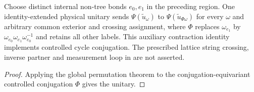 \begin{lemma}%
    \label{thm:peps_regular_two_cycle_global_conjugation}
    \leanok
    Choose distinct internal non-tree bonds $e_0,e_1$ in the preceding region.
    One identity-extended physical unitary sends
    $\Psi(\widetilde u_\omega)$ to $\Psi(\widetilde u_{\Phi\omega})$ for every
    $\omega$ and arbitrary common exterior and crossing assignment, where
    $\Phi$ replaces $\omega_{e_1}$ by
    $\omega_{e_0}\omega_{e_1}\omega_{e_0}^{-1}$ and retains all other labels.
    This auxiliary contraction identity implements controlled cycle conjugation.
    The prescribed lattice string crossing, inverse partner and measurement
    loop in \cite[Section 6.6, fluxon braiding]{Schuch2010PEPS} are not asserted.
\end{lemma}
\begin{proof}\leanok
    Applying the global permutation theorem to the conjugation-equivariant
    controlled conjugation $\Phi$ gives the unitary.
\end{proof}
